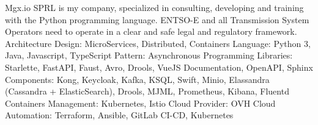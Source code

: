 \documentclass[
  a4paper,
]{fortysecondscv}
\begin{document}
\makefrontsidebar

\begin{cvtable}
    {Mgx.io SPRL is my company, specialized in consulting, developing and training with the Python programming language.}
    {ENTSO-E and all Transmission System Operators need to operate in a clear and safe legal and regulatory framework. 
     Architecture Design: MicroServices, Distributed, Containers
     Language: Python 3, Java, Javascript, TypeScript
     Pattern: Asynchronous Programming
     Libraries: Starlette, FastAPI, Faust, Avro, Drools, VueJS
     Documentation, OpenAPI, Sphinx
     Components: Kong, Keycloak, Kafka, KSQL, Swift, Minio, Elassandra (Cassandra + ElasticSearch), Drools, MJML, Prometheus, Kibana, Fluentd
     Containers Management: Kubernetes, Istio
     Cloud Provider: OVH Cloud
     Automation: Terraform, Ansible, GitLab CI-CD, Kubernetes
    }
\end{cvtable}
\end{document}
